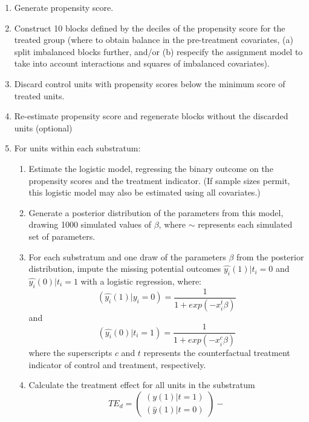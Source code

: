 \documentclass[11pt,titlepage]{article}
\begin{document}
\begin{enumerate}
\item Generate propensity score.
\item Construct 10 blocks defined by the deciles of the propensity
  score for the treated group (where to obtain balance in the
  pre-treatment covariates, (a) split imbalanced blocks further,
  and/or (b) respecify the assignment model to take into account
  interactions and squares of imbalanced covariates).
\item Discard control units with propensity scores below the minimum
  score of treated units.
\item Re-estimate propensity score and regenerate blocks without the
  discarded units (optional)
\item For units within each substratum: \label{sub}
  \begin{enumerate}
  \item{Estimate the logistic model, regressing the binary outcome on
      the propensity scores and the treatment indicator.  (If sample
      sizes permit, this logistic model may also be estimated using
      all covariates.)} \label{sub1}
  \item{Generate a posterior distribution of the parameters from this
      model, drawing 1000 simulated values of $\beta$, where $\sim$
      represents each simulated set of parameters.}
  \item{For each substratum and one draw of the parameters $\beta$
      from the posterior distribution, impute the missing potential
      outcomes $\hat{y_i}(1)|t_i=0$ and $\hat{y_i}(0)|t_i=1$ with a
      logistic regression, where:
      \begin{equation}
        (\hat{y_i}(1)|y_i=0) = \frac{1}{1+exp(-x_i^t \beta)}
      \end{equation}
      and
      \begin{equation}
        (\hat{y_i}(0)|t_i=1) = \frac{1}{1+exp(-x_i^c \beta)}
      \end{equation}
      where the superscripts $c$ and $t$ represents the counterfactual
      treatment indicator of control and treatment, respectively.}
  \item{Calculate the treatment effect for all units in the substratum
      \begin{equation}
        TE_{d} = \left( \begin{array}{c}
            (y(1) | t=1) \\
            (\hat{y}(1) | t=0)
          \end{array} \right)- 

\end{equation}}
\end{enumerate}
\end{enumerate}
\end{document}
